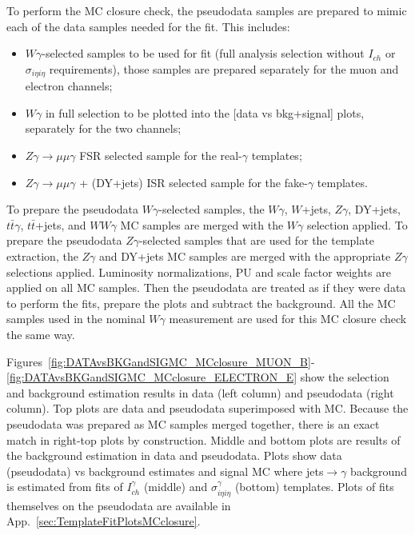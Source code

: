 \clearpage

To perform the MC closure check, the pseudodata samples are prepared to mimic each of the data samples needed for the fit. This includes:
\begin{itemize}
  \item $W\gamma$-selected samples to be used for fit (full analysis selection without $I_{ch}$ or $\sigma_{i\eta i\eta}$ requirements), those samples are prepared separately for the muon and electron channels;
  \item $W\gamma$ in full selection to be plotted into the [data vs bkg+signal] plots, separately for the two channels;
  \item $Z\gamma\rightarrow\mu\mu\gamma$ FSR selected sample for the real-$\gamma$ templates;
  \item $Z\gamma\rightarrow\mu\mu\gamma$ + (DY+jets) ISR selected sample for the fake-$\gamma$ templates.
\end{itemize}

To prepare the pseudodata $W\gamma$-selected samples, the $W\gamma$, $W$+jets, $Z\gamma$, DY+jets, $t\bar{t}\gamma$, $t\bar{t}$+jets, and $WW\gamma$ MC samples are merged with the $W\gamma$ selection applied. To prepare the pseudodata $Z\gamma$-selected samples that are used for the template extraction, the $Z\gamma$ and DY+jets MC samples are merged with the appropriate $Z\gamma$ selections applied. Luminosity normalizations, PU and scale factor weights are applied on all MC samples. Then the pseudodata are treated as if they were data to perform the fits, prepare the plots and subtract the background. All the MC samples used in the nominal $W\gamma$ measurement are used for this MC closure check the same way.

Figures~\ref{fig:DATAvsBKGandSIGMC_MCclosure_MUON_B}-\ref{fig:DATAvsBKGandSIGMC_MCclosure_ELECTRON_E} show the selection and background estimation results in data (left column) and pseudodata (right column). Top plots are data and pseudodata superimposed with MC. Because the pseudodata was prepared as MC samples merged together, there is an exact match in right-top plots by construction. Middle and bottom plots are results of the background estimation in data and pseudodata. Plots show data (pseudodata) vs background estimates and signal MC where jets$\rightarrow\gamma$ background is estimated from fits of $I_{ch}^{\gamma}$ (middle) and  $\sigma_{i\eta i\eta}^{\gamma}$ (bottom) templates. Plots of fits themselves on the pseudodata are available in App.~\ref{sec:TemplateFitPlotsMCclosure}.

